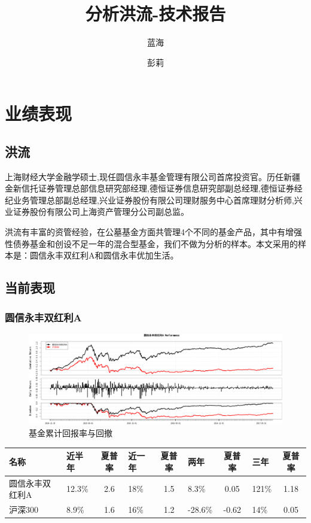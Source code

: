 \documentclass[hyperref,]{ctexart}
\title{分析洪流-技术报告}
\author{蓝海 \and 彭莉}
\date{}
\begin{document}
\maketitle

{
\setcounter{tocdepth}{2}
\tableofcontents
}
\section{业绩表现}

\subsection{洪流}

上海财经大学金融学硕士,现任圆信永丰基金管理有限公司首席投资官。历任新疆金新信托证券管理总部信息研究部经理,德恒证券信息研究部副总经理,德恒证券经纪业务管理总部副总经理,兴业证券股份有限公司理财服务中心首席理财分析师,兴业证券股份有限公司上海资产管理分公司副总监。

洪流有丰富的资管经验，在公墓基金方面共管理4个不同的基金产品，其中有增强性债券基金和创设不足一年的混合型基金，我们不做为分析的样本。本文采用的样本是：圆信永丰双红利A和圆信永丰优加生活。

\subsection{当前表现}

\subsubsection{圆信永丰双红利A}\label{a}

\begin{figure}[htbp]
\centering
\includegraphics{hongliu-details_files/figure-latex/unnamed-chunk-2-1.pdf}
\caption{基金累计回报率与回撤}
\end{figure}

\begin{longtable}[]{@{}llclclclc@{}}
\toprule
名称 & 近半年 & 夏普率 & 近一年 & 夏普率 & 两年 & 夏普率 & 三年 &
夏普率\tabularnewline
\midrule
\endhead
圆信永丰双红利A & 12.3\% & 2.6 & 18\% & 1.5 & 8.3\% & 0.05 & 121\% &
1.18\tabularnewline
沪深300 & 8.9\% & 1.6 & 16\% & 1.2 & -28.6\% & -0.62 & 14\% &
0.05\tabularnewline
\bottomrule
\end{longtable}
\end{document}
